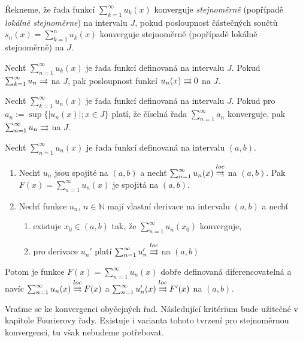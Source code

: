 \begin{definice}
Řekneme, že řada funkcí $\sum_{k=1}^{\infty} u_k (x)$ konverguje \emph{stejnoměrně} (popřípadě \emph{lokálně stejnoměrne}) na intervalu $J$, pokud posloupnost částečných součtů $s_n(x) = \sum_{k=1}^{n} u_k (x)$ konverguje stejnoměrně (popřípadě lokálně stejnoměrně) na $J$.
\end{definice}

\begin{vetal}
Nechť $\sum_{n=1}^{\infty} u_k (x)$ je řada funkcí definovaná na intervalu $J$. Pokud $\sum_{k=1}^{\infty} u_n \rightrightarrows$ na $J$, pak posloupnost funkcí $u_n (x) \rightrightarrows 0$ na $J$.
\end{vetal}

\begin{vetal}
Nechť $\sum_{k=1}^{\infty} u_n (x)$ je řada funkcí definovaná na intervalu $J$. Pokud pro $a_n := \sup \{ | u_n (x) |; x \in J \}$ platí, že číselná řada $\sum_{n=1}^{\infty} a_n$ konverguje, pak $\sum_{n=1}^{\infty} u_n \rightrightarrows$ na $J$.
\end{vetal}

\begin{vetal}
Nechť $\sum_{n=1}^{\infty} u_n (x)$ je řada funkcí definovaná na intervalu $(a,b)$.
\begin{enumerate}
\item Nechť $u_n$ jsou spojité na $(a,b)$ a nechť $\sum_{n=1}^{\infty} u_n (x) \overset{loc}{\rightrightarrows}$ na $(a,b)$. Pak $F (x) = \sum_{n=1}^{\infty} u_n (x)$ je spojitá na $(a,b)$.
\item Nechť funkce $u_n$, $n \in \mathbb{N}$ mají vlastní derivace na intervalu $(a,b)$ a nechť
	\begin{enumerate}
	\item existuje $x_0 \in (a,b)$ tak, že $\sum_{n=1}^{\infty} u_n (x_0)$ konverguje,
	\item pro derivace $u_n'$ platí $\sum_{n=1}^{\infty} u_n' \overset{loc}{\rightrightarrows}$ na $(a,b)$
	\end{enumerate}
\end{enumerate}
Potom je funkce $F(x) = \sum_{n=1}^{\infty} u_n (x)$ dobře definovaná diferencovatelná a navíc $\sum_{n=1}^{\infty} u_n (x) \overset{loc}{\rightrightarrows} F(x)$ a $\sum_{n=1}^{\infty} u'_n (x) \overset{loc}{\rightrightarrows} F'(x)$ na $(a,b)$.
\end{vetal}

Vraťme se ke konvergenci obyčejných řad. Následující kritérium bude užitečné v kapitole Fourierovy řady. Existuje i varianta tohoto tvrzení pro stejnoměrnou konvergenci, tu však nebudeme potřebovat.

